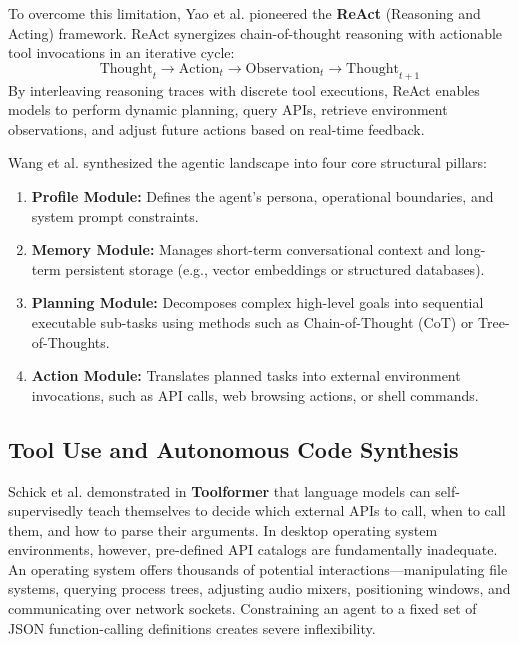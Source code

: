 To overcome this limitation, Yao et al. \cite{yao2023react} pioneered the \textbf{ReAct} (Reasoning and Acting) framework. ReAct synergizes chain-of-thought reasoning with actionable tool invocations in an iterative cycle:
\begin{equation}
    \text{Thought}_t \longrightarrow \text{Action}_t \longrightarrow \text{Observation}_t \longrightarrow \text{Thought}_{t+1}
\end{equation}
By interleaving reasoning traces with discrete tool executions, ReAct enables models to perform dynamic planning, query APIs, retrieve environment observations, and adjust future actions based on real-time feedback.

Wang et al. \cite{wang2023survey} synthesized the agentic landscape into four core structural pillars:
\begin{enumerate}
    \item \textbf{Profile Module:} Defines the agent's persona, operational boundaries, and system prompt constraints.
    \item \textbf{Memory Module:} Manages short-term conversational context and long-term persistent storage (e.g., vector embeddings or structured databases).
    \item \textbf{Planning Module:} Decomposes complex high-level goals into sequential executable sub-tasks using methods such as Chain-of-Thought (CoT) \cite{wei2022chain} or Tree-of-Thoughts.
    \item \textbf{Action Module:} Translates planned tasks into external environment invocations, such as API calls, web browsing actions, or shell commands.
\end{enumerate}

\subsection{Tool Use and Autonomous Code Synthesis}
Schick et al. \cite{schick2023toolformer} demonstrated in \textbf{Toolformer} that language models can self-supervisedly teach themselves to decide which external APIs to call, when to call them, and how to parse their arguments. In desktop operating system environments, however, pre-defined API catalogs are fundamentally inadequate. An operating system offers thousands of potential interactions---manipulating file systems, querying process trees, adjusting audio mixers, positioning windows, and communicating over network sockets. Constraining an agent to a fixed set of JSON function-calling definitions creates severe inflexibility.

